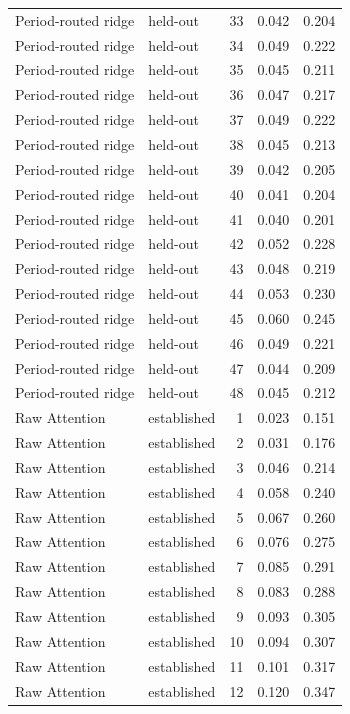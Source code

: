 \begin{tabular}{llrrr}
Period-routed ridge & held-out & 33 & 0.042 & 0.204 \\
Period-routed ridge & held-out & 34 & 0.049 & 0.222 \\
Period-routed ridge & held-out & 35 & 0.045 & 0.211 \\
Period-routed ridge & held-out & 36 & 0.047 & 0.217 \\
Period-routed ridge & held-out & 37 & 0.049 & 0.222 \\
Period-routed ridge & held-out & 38 & 0.045 & 0.213 \\
Period-routed ridge & held-out & 39 & 0.042 & 0.205 \\
Period-routed ridge & held-out & 40 & 0.041 & 0.204 \\
Period-routed ridge & held-out & 41 & 0.040 & 0.201 \\
Period-routed ridge & held-out & 42 & 0.052 & 0.228 \\
Period-routed ridge & held-out & 43 & 0.048 & 0.219 \\
Period-routed ridge & held-out & 44 & 0.053 & 0.230 \\
Period-routed ridge & held-out & 45 & 0.060 & 0.245 \\
Period-routed ridge & held-out & 46 & 0.049 & 0.221 \\
Period-routed ridge & held-out & 47 & 0.044 & 0.209 \\
Period-routed ridge & held-out & 48 & 0.045 & 0.212 \\
Raw Attention & established & 1 & 0.023 & 0.151 \\
Raw Attention & established & 2 & 0.031 & 0.176 \\
Raw Attention & established & 3 & 0.046 & 0.214 \\
Raw Attention & established & 4 & 0.058 & 0.240 \\
Raw Attention & established & 5 & 0.067 & 0.260 \\
Raw Attention & established & 6 & 0.076 & 0.275 \\
Raw Attention & established & 7 & 0.085 & 0.291 \\
Raw Attention & established & 8 & 0.083 & 0.288 \\
Raw Attention & established & 9 & 0.093 & 0.305 \\
Raw Attention & established & 10 & 0.094 & 0.307 \\
Raw Attention & established & 11 & 0.101 & 0.317 \\
Raw Attention & established & 12 & 0.120 & 0.347 \\

\end{tabular}

